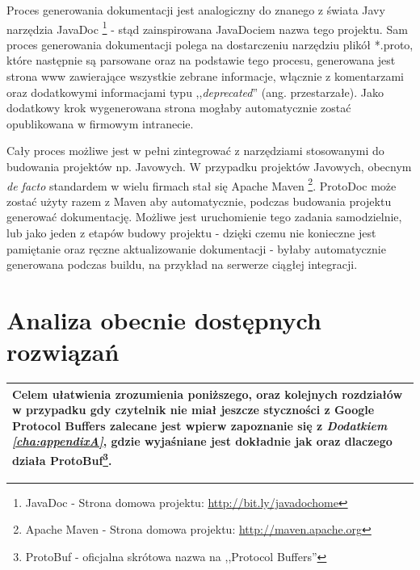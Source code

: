 \documentclass[pdflatex,11pt]{aghdpl}
\begin{document}
Proces generowania dokumentacji jest analogiczny do znanego z świata Javy narzędzia JavaDoc 
\footnote[1]{JavaDoc - Strona domowa projektu: \href{http://bit.ly/javadochome}{http://bit.ly/javadochome}} - stąd zainspirowana JavaDociem nazwa tego projektu. 
Sam proces generowania dokumentacji polega na dostarczeniu narzędziu plikół *.proto, które następnie są parsowane oraz na podstawie tego procesu, 
generowana jest strona www zawierające wszystkie zebrane informacje, włącznie z komentarzami oraz dodatkowymi informacjami 
typu ,,\textit{deprecated}'' (ang. przestarzałe). Jako dodatkowy krok wygenerowana strona mogłaby automatycznie zostać opublikowana w firmowym intranecie.

Cały proces możliwe jest w pełni zintegrować z narzędziami stosowanymi do budowania projektów np. Javowych. W przypadku projektów Javowych, obecnym \textit{de facto}
standardem w wielu firmach stał się Apache Maven \footnote[2]{Apache Maven - Strona domowa projektu: \href{http://maven.apache.org}{http://maven.apache.org}}.
ProtoDoc może zostać użyty razem z Maven aby automatycznie, podczas budowania projektu generować
dokumentację. Możliwe jest uruchomienie tego zadania samodzielnie, lub jako jeden z etapów budowy projektu - dzięki czemu nie konieczne jest pamiętanie oraz ręczne
aktualizowanie dokumentacji - byłaby automatycznie generowana podczas buildu, na przykład na serwerze ciągłej integracji.

\newpage

\chapter{Analiza obecnie dostępnych rozwiązań}
\label{sec:dostepneNarzedzia}


\begin{center}
  \begin{tabular}{ | p{\textwidth} |}
    \hline
      Celem ułatwienia zrozumienia poniższego, oraz kolejnych rozdziałów w przypadku gdy czytelnik nie miał 
      jeszcze styczności z Google Protocol Buffers zalecane jest wpierw
      zapoznanie się z \textit{Dodatkiem \ref{cha:appendixA}}, gdzie wyjaśniane jest dokładnie jak oraz dlaczego działa ProtoBuf\footnote[1]{ProtoBuf - oficjalna skrótowa nazwa na ,,Protocol Buffers''}. \\ \hline
  \end{tabular}
\end{center}
\end{document}
